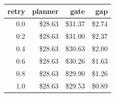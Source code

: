 \begin{tabular}{rrrr}
\toprule
retry & planner & gate & gap \\
\midrule
0.0 & \$28.63 & \$31.37 & \$2.74 \\
0.2 & \$28.63 & \$31.00 & \$2.37 \\
0.4 & \$28.63 & \$30.63 & \$2.00 \\
0.6 & \$28.63 & \$30.26 & \$1.63 \\
0.8 & \$28.63 & \$29.90 & \$1.26 \\
1.0 & \$28.63 & \$29.53 & \$0.89 \\
\bottomrule
\end{tabular}
